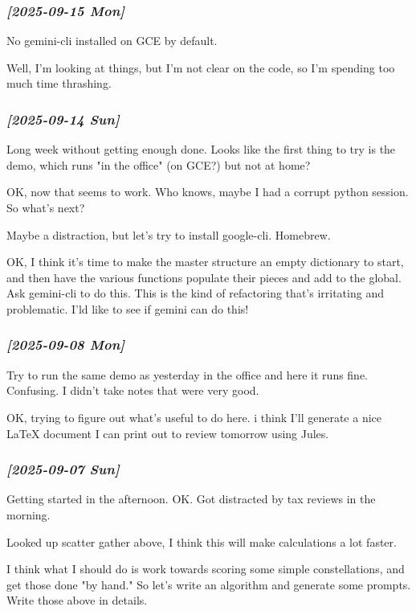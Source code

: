 \documentclass[11pt]{article}
\begin{document}
\subsubsection{\textit{[2025-09-15 Mon]}}
\label{sec:org0652ac6}
No gemini-cli installed on GCE by default. 

Well, I'm looking at things, but I'm not clear on the code,
so I'm spending too much time thrashing.


\subsubsection{\textit{[2025-09-14 Sun]}}
\label{sec:org75b9b80}
Long week without getting enough done. Looks like the first thing to try is
the demo, which runs "in the office" (on GCE?) but not at home?

OK, now that seems to work.  Who knows, maybe I had a corrupt python session.
So what's next?

Maybe a distraction, but let's try to install google-cli.  Homebrew.

OK, I think it's time to make the master structure an  empty dictionary to start, and then
have the various functions populate their pieces and add to the global.
Ask gemini-cli to do this. This is the kind of refactoring that's irritating
and problematic.  I'ld like to see if gemini can do this!

\subsubsection{\textit{[2025-09-08 Mon]}}
\label{sec:orgbcd2783}
Try to run the same demo as yesterday in the office and here it
runs fine.  Confusing.  I didn't take notes that were very good.

OK, trying to figure out what's useful to do here. i think I'll generate a nice
\LaTeX{} document  I can print out to review tomorrow using Jules. 

\subsubsection{\textit{[2025-09-07 Sun]}}
\label{sec:org4334ceb}
Getting started in the afternoon. OK. Got distracted by tax reviews in the morning.

Looked up scatter gather above, I think this will make calculations a lot faster.

I think what I should do is work towards scoring some simple constellations, and
get those done "by hand."  So let's write an algorithm and generate some prompts.
Write those above in details.
\end{document}
